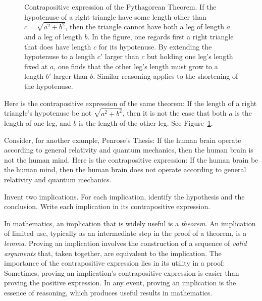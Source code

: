 \begin{figure}
\begin{center}
   \end{center}
   \caption{Contrapositive expression of the Pythagorean Theorem. If the
      hypotenuse of a right triangle have some length other than $c = \sqrt{a^2
      + b^2}$, then the triangle cannot have both a leg of length $a$ and a leg
      of length $b$. In the figure, one regards first a right triangle that
      does have length $c$ for its hypotenuse. By extending the hypotenuse to a
      length $c'$ larger than $c$ but holding one leg's length fixed at $a$,
      one finds that the other leg's length must grow to a length $b'$ larger
      than $b$.  Similar reasoning applies to the shortening of the
      hypotenuse.%
   }
\label{fig:right-triangle}
\end{figure}
Here is the contrapositive expression of the same theorem: If the length of a
right triangle's hypotenuse be not $\sqrt{a^2 + b^2}$, then it is not the case
that both $a$ is the length of one leg, and $b$ is the length of the other leg.
See Figure~\ref{fig:right-triangle}.

Consider, for another example, Penrose's Thesis: If the human brain operate
according to general relativity and quantum mechanics, then the human brain is
not the human mind.  Here is the contrapositive expression: If the human brain
be the human mind, then the human brain does not operate according to general
relativity and quantum mechanics.

\begin{exercise}
   Invent two implications. For each implication, identify the hypothesis and
   the conclusion. Write each implication in its contrapositive expression.
\end{exercise}

In mathematics, an implication that is widely useful is a \emph{theorem}. An
implication of limited use, typically as an intermediate step in the proof of a
theorem, is a \emph{lemma}. Proving an implication involves the construction of
a sequence of \emph{valid arguments} that, taken together, are equivalent to
the implication.  The importance of the contrapositive expression lies in its
utility in a proof: Sometimes, proving an implication's contrapositive
expression is easier than proving the positive expression.  In any event,
proving an implication is the essence of reasoning, which produces useful
results in mathematics.

